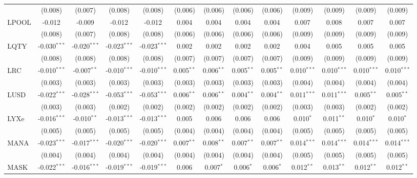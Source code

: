\begin{table}[!htbp]
\begin{tabular}{@{\extracolsep{5pt}}lcccccccccccc}
  & (0.008) & (0.007) & (0.008) & (0.008) & (0.006) & (0.006) & (0.006) & (0.006) & (0.009) & (0.009) & (0.009) & (0.009) \\
 LPOOL & -0.012$^{}$ & -0.009$^{}$ & -0.012$^{}$ & -0.012$^{}$ & 0.004$^{}$ & 0.004$^{}$ & 0.004$^{}$ & 0.004$^{}$ & 0.007$^{}$ & 0.008$^{}$ & 0.007$^{}$ & 0.007$^{}$ \\
  & (0.008) & (0.007) & (0.008) & (0.008) & (0.006) & (0.006) & (0.006) & (0.006) & (0.009) & (0.009) & (0.009) & (0.009) \\
 LQTY & -0.030$^{***}$ & -0.020$^{***}$ & -0.023$^{***}$ & -0.023$^{***}$ & 0.002$^{}$ & 0.002$^{}$ & 0.002$^{}$ & 0.002$^{}$ & 0.004$^{}$ & 0.005$^{}$ & 0.005$^{}$ & 0.005$^{}$ \\
  & (0.008) & (0.008) & (0.008) & (0.008) & (0.007) & (0.007) & (0.007) & (0.007) & (0.009) & (0.009) & (0.009) & (0.009) \\
 LRC & -0.010$^{***}$ & -0.007$^{**}$ & -0.010$^{***}$ & -0.010$^{***}$ & 0.005$^{**}$ & 0.006$^{**}$ & 0.005$^{**}$ & 0.005$^{**}$ & 0.010$^{***}$ & 0.010$^{***}$ & 0.010$^{***}$ & 0.010$^{***}$ \\
  & (0.003) & (0.003) & (0.003) & (0.003) & (0.003) & (0.003) & (0.003) & (0.003) & (0.004) & (0.004) & (0.004) & (0.004) \\
 LUSD & -0.022$^{***}$ & -0.028$^{***}$ & -0.053$^{***}$ & -0.053$^{***}$ & 0.006$^{**}$ & 0.006$^{**}$ & 0.004$^{**}$ & 0.004$^{**}$ & 0.011$^{***}$ & 0.011$^{***}$ & 0.005$^{**}$ & 0.005$^{**}$ \\
  & (0.003) & (0.003) & (0.002) & (0.002) & (0.002) & (0.002) & (0.002) & (0.002) & (0.003) & (0.003) & (0.002) & (0.002) \\
 LYXe & -0.016$^{***}$ & -0.010$^{**}$ & -0.013$^{***}$ & -0.013$^{***}$ & 0.005$^{}$ & 0.006$^{}$ & 0.006$^{}$ & 0.006$^{}$ & 0.010$^{*}$ & 0.011$^{**}$ & 0.010$^{*}$ & 0.010$^{*}$ \\
  & (0.005) & (0.005) & (0.005) & (0.005) & (0.004) & (0.004) & (0.004) & (0.004) & (0.005) & (0.005) & (0.005) & (0.005) \\
 MANA & -0.023$^{***}$ & -0.017$^{***}$ & -0.020$^{***}$ & -0.020$^{***}$ & 0.007$^{**}$ & 0.008$^{**}$ & 0.007$^{**}$ & 0.007$^{**}$ & 0.014$^{***}$ & 0.014$^{***}$ & 0.014$^{***}$ & 0.014$^{***}$ \\
  & (0.004) & (0.004) & (0.004) & (0.004) & (0.004) & (0.004) & (0.004) & (0.004) & (0.005) & (0.005) & (0.005) & (0.005) \\
 MASK & -0.022$^{***}$ & -0.016$^{***}$ & -0.019$^{***}$ & -0.019$^{***}$ & 0.006$^{}$ & 0.007$^{*}$ & 0.006$^{*}$ & 0.006$^{*}$ & 0.012$^{**}$ & 0.013$^{**}$ & 0.012$^{**}$ & 0.012$^{**}$ \\

\end{tabular}
\end{table}
